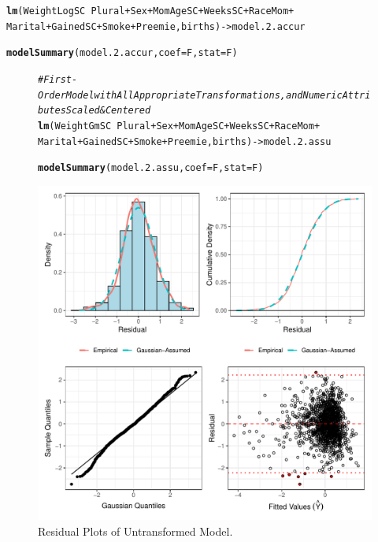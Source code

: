 \documentclass{article}\usepackage[]{graphicx}\usepackage[]{xcolor}
\makeatletter
\def\maxwidth{ %
  \ifdim\Gin@nat@width>\linewidth
    \linewidth
  \else
    \Gin@nat@width
  \fi
}
\newcommand{\hlcom}[1]{\textcolor[rgb]{0.678,0.584,0.686}{\textit{#1}}}%
\newcommand{\hlopt}[1]{\textcolor[rgb]{0,0,0}{#1}}%
\newcommand{\hlstd}[1]{\textcolor[rgb]{0.345,0.345,0.345}{#1}}%
\newcommand{\hlkwb}[1]{\textcolor[rgb]{0.69,0.353,0.396}{#1}}%
\newcommand{\hlkwc}[1]{\textcolor[rgb]{0.333,0.667,0.333}{#1}}%
\newcommand{\hlkwd}[1]{\textcolor[rgb]{0.737,0.353,0.396}{\textbf{#1}}}%
\newenvironment{kframe}{%
 \def\at@end@of@kframe{}%
 \ifinner\ifhmode%
  \def\at@end@of@kframe{\end{minipage}}%
  \begin{minipage}{\columnwidth}%
 \fi\fi%
 \def\FrameCommand##1{\hskip\@totalleftmargin \hskip-\fboxsep
 \colorbox{shadecolor}{##1}\hskip-\fboxsep
     \hskip-\linewidth \hskip-\@totalleftmargin \hskip\columnwidth}%
 \MakeFramed {\advance\hsize-\width
   \@totalleftmargin\z@ \linewidth\hsize
   \@setminipage}}%
 {\par\unskip\endMakeFramed%
 \at@end@of@kframe}
\newenvironment{knitrout}{}{} %
\makeatother
\begin{document}
\begin{knitrout}
\color{fgcolor}\begin{kframe}
\begin{alltt}
\hlkwd{lm}\hlstd{(WeightLogSC} \hlopt{~} \hlstd{Plural} \hlopt{+} \hlstd{Sex} \hlopt{+} \hlstd{MomAgeSC} \hlopt{+} \hlstd{WeeksSC} \hlopt{+} \hlstd{RaceMom} \hlopt{+}
     \hlstd{Marital} \hlopt{+} \hlstd{GainedSC} \hlopt{+} \hlstd{Smoke} \hlopt{+} \hlstd{Preemie, births)} \hlkwb{->} \hlstd{model.2.accur}

\hlkwd{modelSummary}\hlstd{(model.2.accur,} \hlkwc{coef}\hlstd{=F,} \hlkwc{stat}\hlstd{=F)}
\end{alltt}
\end{kframe}
\end{knitrout}

\begin{figure}
\begin{knitrout}
\color{fgcolor}\begin{kframe}
\begin{alltt}
\hlcom{#First-Order Model with All Appropriate Transformations, and Numeric Attributes Scaled & Centered}
\hlkwd{lm}\hlstd{(WeightGmSC} \hlopt{~} \hlstd{Plural} \hlopt{+} \hlstd{Sex} \hlopt{+} \hlstd{MomAgeSC} \hlopt{+} \hlstd{WeeksSC} \hlopt{+} \hlstd{RaceMom} \hlopt{+}
     \hlstd{Marital} \hlopt{+} \hlstd{GainedSC} \hlopt{+} \hlstd{Smoke} \hlopt{+} \hlstd{Preemie, births)} \hlkwb{->} \hlstd{model.2.assu}

\hlkwd{modelSummary}\hlstd{(model.2.assu,} \hlkwc{coef}\hlstd{=F,} \hlkwc{stat}\hlstd{=F)}
\end{alltt}
\end{kframe}
\includegraphics[width=\maxwidth]{figure/unnamed-chunk-12-1} 
\end{knitrout}
\caption{Residual Plots of Untransformed Model.} 
\label{resid.plots.un}
\end{figure}
\end{document}
